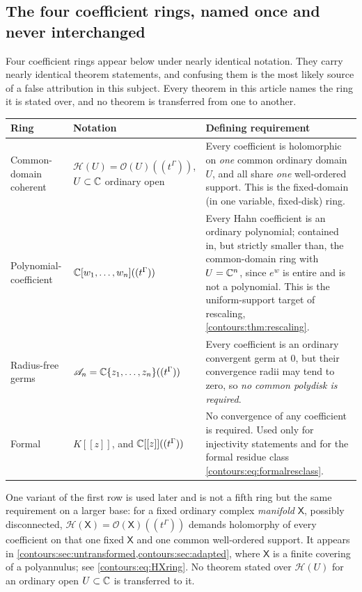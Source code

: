 \documentclass[11pt,letterpaper]{article}
\theoremstyle{definition}
\theoremstyle{remark}
\newcommand{\HH}{\mathcal H}\newcommand{\A}{\mathscr A}\newcommand{\OO}{\mathcal O}
\numberwithin{equation}{section}
\begin{document}
\subsection{The four coefficient rings, named once and never interchanged}
\label{contours:subsec:rings}
Four coefficient rings appear below under nearly identical notation. They carry
nearly identical theorem statements, and confusing them is the most likely source
of a false attribution in this subject. Every theorem in this article names the
ring it is stated over, and no theorem is transferred from one to another.

\begin{center}\small
\begin{longtable}{@{}L{0.20\textwidth}L{0.24\textwidth}L{0.46\textwidth}@{}}
\toprule
Ring & Notation & Defining requirement\\\midrule\endhead
Common-domain coherent & $\HH(U)=\OO(U)((t^\Gamma))$, $U\subset\mathbb C$ ordinary open
  & Every coefficient is holomorphic on \emph{one} common ordinary domain $U$, and
    all share \emph{one} well-ordered support. This is the fixed-domain (in one
    variable, fixed-disk) ring.\\[0.5em]
Polynomial-coefficient & $\mathbb C[w_1,\ldots,w_n]((t^\Gamma))$
  & Every Hahn coefficient is an ordinary polynomial; contained in, but
    strictly smaller than, the common-domain ring with $U=\mathbb C^n$, since
    $e^{w}$ is entire and is not a polynomial. This is the uniform-support target of
    rescaling, \cref{contours:thm:rescaling}.\\[0.5em]
Radius-free germs & $\A_n=\C\{z_1,\ldots,z_n\}((t^\Gamma))$
  & Every coefficient is an ordinary convergent germ at $0$, but their convergence
    radii may tend to zero, so \emph{no common polydisk is required}.\\[0.5em]
Formal & $K[[z]]$, and $\mathbb C[[z]]((t^\Gamma))$
  & No convergence of any coefficient is required. Used only for injectivity
    statements and for the formal residue class
    \eqref{contours:eq:formalresclass}.\\
\bottomrule
\end{longtable}
\end{center}

One variant of the first row is used later and is not a fifth ring but the same
requirement on a larger base: for a fixed ordinary complex \emph{manifold}
$\mathsf X$, possibly disconnected, $\HH(\mathsf X)=\OO(\mathsf X)((t^\Gamma))$
demands holomorphy of every coefficient on that one fixed $\mathsf X$ and one
common well-ordered support. It appears in
\cref{contours:sec:untransformed,contours:sec:adapted}, where $\mathsf X$ is a
finite covering of a polyannulus; see \eqref{contours:eq:HXring}. No theorem
stated over $\HH(U)$ for an ordinary open $U\subset\mathbb C$ is transferred to it.
\end{document}
